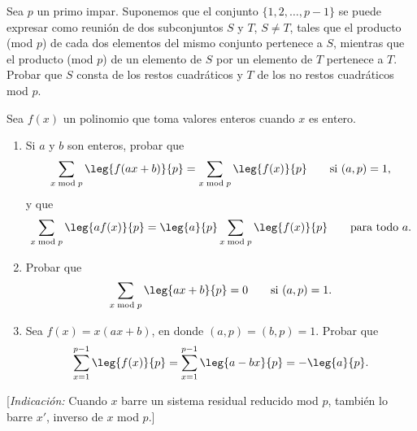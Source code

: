 \documentclass[12pt,a4paper]{book}
\begin{document}
    \begin{ejercicio}
        Sea $p$ un primo impar. Suponemos que el conjunto $\{1,2,\dots,p-1\}$ se puede
        expresar como reunión de dos subconjuntos $S$ y $T$, $S\neq T$, tales que el
        producto (mod $p$) de cada dos elementos del mismo conjunto pertenece a $S$,
        mientras que el producto (mod $p$) de un elemento de $S$ por un elemento de $T$
        pertenece a $T$. Probar que $S$ consta de los restos cuadráticos y $T$ de los no
        restos cuadráticos mod $p$.
    \end{ejercicio}

    \begin{ejercicio}
        Sea $f(x)$ un polinomio que toma valores enteros cuando $x$ es entero.
        \begin{enumerate}
            \item[(a)] Si $a$ y $b$ son enteros, probar que
            \begin{equation*}
                \sum_{x\bmod p}\leg{f(ax+b)}{p}=\sum_{x\bmod p}\leg{f(x)}{p}\qquad\text{si }(a,p)=1,
            \end{equation*}
            y que
            \begin{equation*}
                \sum_{x\bmod p}\leg{af(x)}{p}=\leg{a}{p}\sum_{x\bmod p}\leg{f(x)}{p}\qquad\text{para todo }a.
            \end{equation*}
            \item[(b)] Probar que
            \begin{equation*}
                \sum_{x\bmod p}\leg{ax+b}{p}=0\qquad\text{si }(a,p)=1.
            \end{equation*}
            \item[(c)] Sea $f(x)=x(ax+b)$, en donde $(a,p)=(b,p)=1$. Probar que
            \begin{equation*}
                \sum_{x=1}^{p-1}\leg{f(x)}{p}=\sum_{x=1}^{p-1}\leg{a-bx}{p}=-\leg{a}{p}.
            \end{equation*}
        \end{enumerate}
        [\textit{Indicación:} Cuando $x$ barre un sistema residual reducido mod $p$,
        también lo barre $x'$, inverso de $x$ mod $p$.]
    \end{ejercicio}
\end{document}
